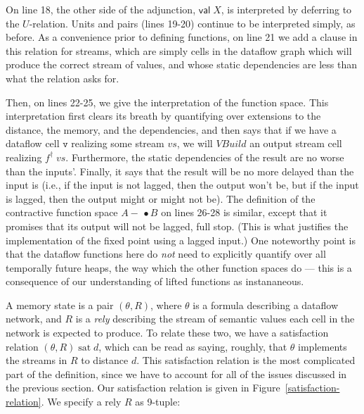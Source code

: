 \documentclass[nocopyrightspace,preprint]{sigplanconf}
\newcommand{\term}[1]{\ensuremath{\mathtt{{#1}}}}
\newcommand{\Build}{\mathit{VBuild}}
\newcommand{\lollishrink}{-\!\!\!\,\bullet}
\newcommand{\valtype}[1]{\mathsf{val}\;{#1}}
\newcommand{\satisfy}[2]{{#1}\;\mathrm{sat}\;{#2}}
\begin{document}
On line 18, the other side of the adjunction, $\valtype{X}$, is
interpreted by deferring to the $U$-relation.  Units and pairs (lines
19-20) continue to be interpreted simply, as before.  As a convenience
prior to defining functions, on line 21 we add a clause in this relation
for streams, which are simply cells in the dataflow graph which will
produce the correct stream of values, and whose static dependencies
are less than what the relation asks for.

Then, on lines 22-25, we give the interpretation of the function
space.  This interpretation first clears its breath by quantifying
over extensions to the distance, the memory, and the dependencies, and
then says that if we have a dataflow cell \term{v} realizing some
stream $vs$, we will $\Build$ an output stream cell realizing
$f^\dagger\;vs$. Furthermore, the static dependencies of the result
are no worse than the inputs'. Finally, it says that the result will
be no more delayed than the input is (i.e., if the input is not
lagged, then the output won't be, but if the input is lagged, then the
output might or might not be). The definition of the contractive
function space $A \lollishrink B$ on lines 26-28 is similar, except that it
promises that its output will not be lagged, full stop. (This is what
justifies the implementation of the fixed point using a lagged input.)
One noteworthy point is that the dataflow functions here do \emph{not}
need to explicitly quantify over all temporally future heaps, the way 
which the other function spaces do --- this is a consequence of our
understanding of lifted functions as instananeous. 

A memory state is a pair $(\theta, R)$, where $\theta$ is a formula
describing a dataflow network, and $R$ is a \emph{rely} describing the
stream of semantic values each cell in the network is expected to
produce. To relate these two, we have a satisfaction relation
$\satisfy{(\theta, R)}{d}$, which can be read as saying, roughly, that
$\theta$ implements the streams in $R$ to distance $d$. This
satisfaction relation is the most complicated part of the definition,
since we have to account for all of the issues discussed in the
previous section. Our satisfaction relation is given in
Figure~\ref{satisfaction-relation}.
We specify a rely $R$ as 9-tuple:
\end{document}
